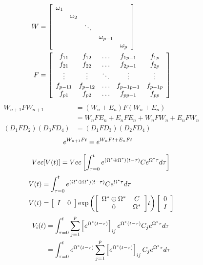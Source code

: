\documentclass{article}
\begin{document}
\begin{align}
W &= \Matrix{ccccc}{
    \omega_1 &&&&\\
    & \omega_2 &&&\\
    && \ddots &&\\
    &&& \omega_{p-1} & \\
    &&&& \omega_p
} \\
F &= \Matrix{ccccc}{
    f_{11} & f_{12} & \hdots & f_{1p-1} & f_{1p} \\
    f_{21} & f_{22} & \hdots & f_{2p-1} & f_{2p} \\
    \vdots & \vdots & \ddots & \vdots   & \vdots \\
    f_{p-11} & f_{p-12} & \hdots & f_{p-1p-1} & f_{p-1p} \\
    f_{p1} & f_{p2} & \hdots & f_{pp-1} & f_{pp}
}
\end{align}
\begin{align}
    W_{n+1}FW_{n+1} &= (W_n + E_n)F(W_n + E_n)
    \\& = W_nFE_n + E_nFE_n + W_nFW_n + E_nFW_n
    \\(D_1FD_2)(D_3FD_4) &= (D_1FD_3)(D_2FD_4)
\end{align}
\begin{align}
    \Exp{W_{n+1}Ft} &= \Exp{W_nFt + E_nFt}
\end{align}

\begin{align}
    Vec[V(t)]=Vec\left[\int_{\tau=0}^t  \Exp{\left(\Omega\tr \oplus \Omega\tr\right)(t-\tau)} C \Exp{\Omega\tr \tau} d \tau \right]\,
\end{align}
\begin{align}
    V(t)&=\int_{\tau=0}^t  \Exp{\left(\Omega\tr \oplus \Omega\tr\right)(t-\tau)} C \Exp{\Omega\tr \tau} d \tau 
    \\V(t)&=\Matrix{cc}{I & 0}\exp\left({\Matrix{cc}{\Omega^*\oplus\Omega^* & C \\ 0 & \Omega^* }}t\right)\Matrix{c}{0\\I}
\end{align}
\begin{align}
    V_i(t)&=\int_{\tau=0}^t  \sum_{j=1}^p \left[\Exp{\Omega\tr(t-\tau)}\right]_{ij} \Exp{\Omega\tr(t-\tau)} C_j \Exp{\Omega\tr \tau} d \tau 
    \\&=\int_{\tau=0}^t \Exp{\Omega\tr(t-\tau)} \sum_{j=1}^p \left[\Exp{\Omega\tr(t-\tau)}\right]_{ij} C_j \Exp{\Omega\tr \tau} d \tau 
\end{align}
\end{document}
